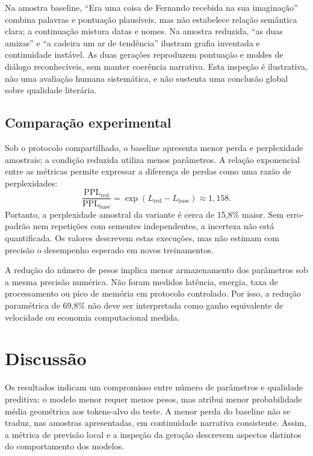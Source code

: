 \documentclass[conference]{IEEEtran}
\begin{document}
Na amostra baseline, “Era uma coisa de Fernando recebida na sua imaginação” combina palavras e pontuação plausíveis, mas não estabelece relação semântica clara; a continuação mistura datas e nomes. Na amostra reduzida, “as duas amizas” e “a cadeira um ar de tendência” ilustram grafia inventada e continuidade instável. As duas gerações reproduzem pontuação e moldes de diálogo reconhecíveis, sem manter coerência narrativa. Esta inspeção é ilustrativa, não uma avaliação humana sistemática, e não sustenta uma conclusão global sobre qualidade literária.

\subsection{Comparação experimental}

Sob o protocolo compartilhado, o baseline apresenta menor perda e perplexidade amostrais; a condição reduzida utiliza menos parâmetros. A relação exponencial entre as métricas permite expressar a diferença de perdas como uma razão de perplexidades:
\begin{equation}
\frac{\mathrm{PPL}_{\mathrm{red}}}{\mathrm{PPL}_{\mathrm{base}}}
=\exp(L_{\mathrm{red}}-L_{\mathrm{base}})\approx 1{,}158.
\end{equation}
Portanto, a perplexidade amostral da variante é cerca de 15,8\% maior. Sem erro-padrão nem repetições com sementes independentes, a incerteza não está quantificada. Os valores descrevem estas execuções, mas não estimam com precisão o desempenho esperado em novos treinamentos.

A redução do número de pesos implica menor armazenamento dos parâmetros sob a mesma precisão numérica. Não foram medidos latência, energia, taxa de processamento ou pico de memória em protocolo controlado. Por isso, a redução paramétrica de 69,8\% não deve ser interpretada como ganho equivalente de velocidade ou economia computacional medida.

\section{Discussão}

Os resultados indicam um compromisso entre número de parâmetros e qualidade preditiva: o modelo menor requer menos pesos, mas atribui menor probabilidade média geométrica aos tokens-alvo do teste. A menor perda do baseline não se traduz, nas amostras apresentadas, em continuidade narrativa consistente. Assim, a métrica de previsão local e a inspeção da geração descrevem aspectos distintos do comportamento dos modelos.
\end{document}
